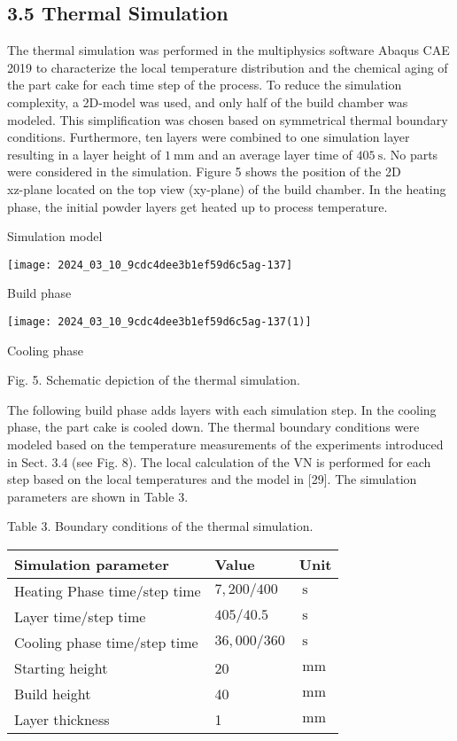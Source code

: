 \documentclass[10pt]{article}
\begin{document}
\subsection*{3.5 Thermal Simulation}
The thermal simulation was performed in the multiphysics software Abaqus CAE 2019 to characterize the local temperature distribution and the chemical aging of the part cake for each time step of the process. To reduce the simulation complexity, a 2D-model was used, and only half of the build chamber was modeled. This simplification was chosen based on symmetrical thermal boundary conditions. Furthermore, ten layers were combined to one simulation layer resulting in a layer height of $1 \mathrm{~mm}$ and an average layer time of $405 \mathrm{~s}$. No parts were considered in the simulation. Figure 5 shows the position of the 2D\\
xz-plane located on the top view (xy-plane) of the build chamber. In the heating phase, the initial powder layers get heated up to process temperature.

Simulation model

\begin{center}
\texttt{[image: 2024\_03\_10\_9cdc4dee3b1ef59d6c5ag-137]}
\end{center}

Build phase

\begin{center}
\texttt{[image: 2024\_03\_10\_9cdc4dee3b1ef59d6c5ag-137(1)]}
\end{center}

Cooling phase

Fig. 5. Schematic depiction of the thermal simulation.

The following build phase adds layers with each simulation step. In the cooling phase, the part cake is cooled down. The thermal boundary conditions were modeled based on the temperature measurements of the experiments introduced in Sect. 3.4 (see Fig. 8). The local calculation of the $\mathrm{VN}$ is performed for each step based on the local temperatures and the model in [29]. The simulation parameters are shown in Table 3.

Table 3. Boundary conditions of the thermal simulation.

\begin{center}
\begin{tabular}{l|l|l}
\hline
Simulation parameter & Value & Unit \\
\hline
Heating Phase time/step time & $7,200 / 400$ & $\mathrm{~s}$ \\
\hline
Layer time/step time & $405 / 40.5$ & $\mathrm{~s}$ \\
\hline
Cooling phase time/step time & $36,000 / 360$ & $\mathrm{~s}$ \\
\hline
Starting height & 20 & $\mathrm{~mm}$ \\
\hline
Build height & 40 & $\mathrm{~mm}$ \\
\hline
Layer thickness & 1 & $\mathrm{~mm}$ \\
\hline
\end{tabular}
\end{center}
\end{document}

